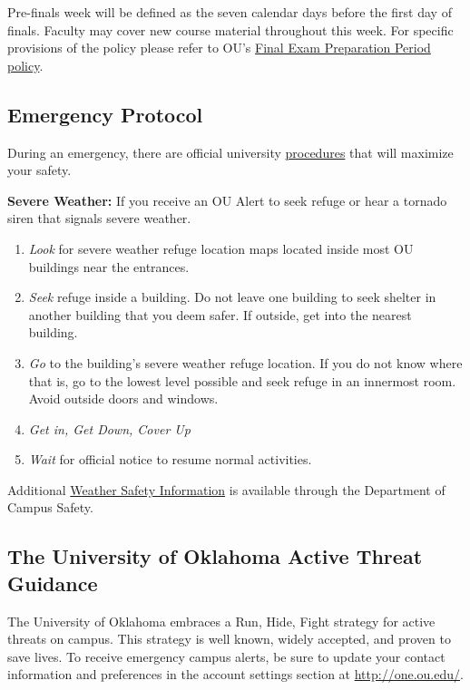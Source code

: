 \documentclass[11pt,english]{article}
\begin{document}
Pre-finals week will be defined as the seven calendar days before the first day of finals. Faculty may cover new course material throughout this week. For specific provisions of the policy please refer to OU's \href{https://www.ou.edu/registrar/academic-records/academic-calendars/final-exam-schedule/final-exam-policies}{Final Exam Preparation Period policy}.

\subsection*{Emergency Protocol}

During an emergency, there are official university \href{https://www.ou.edu/campussafety/policy-and-procedures}{procedures} that will maximize your safety.

\textbf{Severe Weather:} If you receive an OU Alert to seek refuge or hear a tornado siren that signals severe weather.

\begin{enumerate}
    \item \textit{Look} for severe weather refuge location maps located inside most OU buildings near the entrances.
    \item \textit{Seek} refuge inside a building. Do not leave one building to seek shelter in another building that you deem safer. If outside, get into the nearest building.
    \item \textit{Go} to the building's severe weather refuge location. If you do not know where that is, go to the lowest level possible and seek refuge in an innermost room. Avoid outside doors and windows.
    \item \textit{Get in, Get Down, Cover Up}
    \item \textit{Wait} for official notice to resume normal activities.
\end{enumerate}

Additional \href{https://www.ou.edu/campussafety/divisions#management}{Weather Safety Information} is available through the Department of Campus Safety.

\subsection*{The University of Oklahoma Active Threat Guidance}

The University of Oklahoma embraces a Run, Hide, Fight strategy for active threats on campus. This strategy is well known, widely accepted, and proven to save lives. To receive emergency campus alerts, be sure to update your contact information and preferences in the account settings section at \url{http://one.ou.edu/}.
\end{document}
